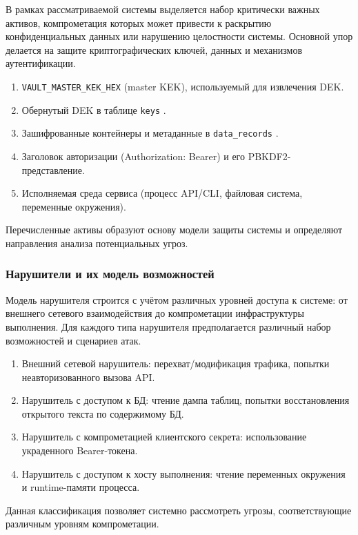 \documentclass[14pt, a4paper]{extarticle}
\renewcommand{\texttt}[1]{%
  {\def\UrlFont{\ttfamily}\nolinkurl{#1}}%
}
\begin{document}
	В рамках рассматриваемой системы выделяется набор критически важных активов, компрометация которых может привести к раскрытию конфиденциальных данных или нарушению целостности системы. Основной упор делается на защите криптографических ключей, данных и механизмов аутентификации.
	
	\begin{enumerate}
	\item \texttt{VAULT\_MASTER\_KEK\_HEX} (master KEK), используемый для извлечения DEK.
	\item Обернутый DEK в таблице \texttt{keys}.
	\item Зашифрованные контейнеры и метаданные в \texttt{data\_records}.
	\item Заголовок авторизации (Authorization: Bearer) и его PBKDF2-представление.
	\item Исполняемая среда сервиса (процесс API/CLI, файловая система, переменные окружения).
	\end{enumerate}
	
	Перечисленные активы образуют основу модели защиты системы и определяют направления анализа потенциальных угроз.
		
	\subsubsection{Нарушители и их модель возможностей}
	
	Модель нарушителя строится с учётом различных уровней доступа к системе: от внешнего сетевого взаимодействия до компрометации инфраструктуры выполнения. Для каждого типа нарушителя предполагается различный набор возможностей и сценариев атак.
	
	\begin{enumerate}
	\item Внешний сетевой нарушитель: перехват/модификация трафика, попытки неавторизованного вызова API.
	\item Нарушитель с доступом к БД: чтение дампа таблиц, попытки восстановления открытого текста по содержимому БД.
	\item Нарушитель с компрометацией клиентского секрета: использование украденного Bearer-токена.
	\item Нарушитель с доступом к хосту выполнения: чтение переменных окружения и runtime-памяти процесса.
	\end{enumerate}
	
	Данная классификация позволяет системно рассмотреть угрозы, соответствующие различным уровням компрометации.
		
\end{document}
